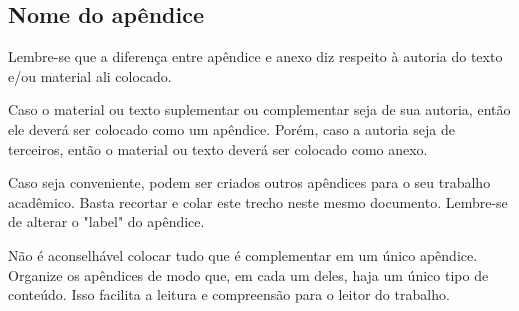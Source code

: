 
\begin{apendicesenv}
\partapendices

\chapter{Nome do apêndice} %
\label{chap:apendiceA}

Lembre-se que a diferença entre apêndice e anexo diz respeito à autoria do texto e/ou material ali colocado.

Caso o material ou texto suplementar ou complementar seja de sua autoria, então ele deverá ser colocado como um apêndice. Porém, caso a autoria seja de terceiros, então o material ou texto deverá ser colocado como anexo.

Caso seja conveniente, podem ser criados outros apêndices para o seu trabalho acadêmico. Basta recortar e colar este trecho neste mesmo documento. Lembre-se de alterar o "label"{} do apêndice.

Não é aconselhável colocar tudo que é complementar em um único apêndice. Organize os apêndices de modo que, em cada um deles, haja um único tipo de conteúdo. Isso facilita a leitura e compreensão para o leitor do trabalho.

\end{apendicesenv}
